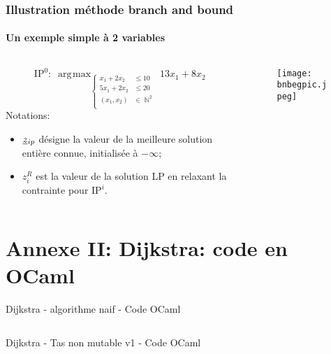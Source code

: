 \documentclass[10pt]{beamer}
\DeclareMathOperator{\NN}{\mathbb{N}}
\DeclareMathOperator*{\argmax}{\arg\!\max}
\begin{document}
\begin{frame}
\frametitle{Illustration méthode branch and bound}
\framesubtitle{Un exemple simple à 2 variables}


\begin{columns}
\begin{column}{0.4\textwidth}
\small
\begin{equation*}
\text{IP}^0:\;\argmax_{\left\lbrace
\begin{aligned}
  x_1+2 x_2 & \leq 10\\
  5 x_1 +2 x_2 & \leq 20\\
  (x_1,x_2)& \in \NN^2\\
\end{aligned}\right.}
13 x_1 + 8 x_2
\end{equation*}
Notations:
\begin{itemize}
\item $\mbox{{\underline{$z$}}$_{ip}$}$ désigne la valeur de la meilleure solution entière connue, initialisée à $-\infty$;
\item $z_i^R$ est la valeur de la solution LP en relaxant la contrainte pour $\text{IP}^i$.
\end{itemize}

\end{column}
\begin{column}{0.6\textwidth}
\begin{figure}
\centering
\vspace{-0.5cm}\texttt{[image: bnbegpic.jpeg]}
\end{figure}
\end{column}
\end{columns}

\end{frame}
\section{Annexe II: \textbf{Dijkstra: code en OCaml}}

\begin{frame}[t,allowframebreaks]{Dijkstra - algorithme naif - }{Code OCaml}
\scriptsize
\inputminted{ocaml}{dijkstra-naif.ml}
\end{frame}


\begin{frame}[t,allowframebreaks]{Dijkstra - Tas non mutable v1 - }{Code OCaml}
\scriptsize
\inputminted{ocaml}{dijkstra-tas-non-mutable-v1.ml}
\end{frame}
\end{document}
